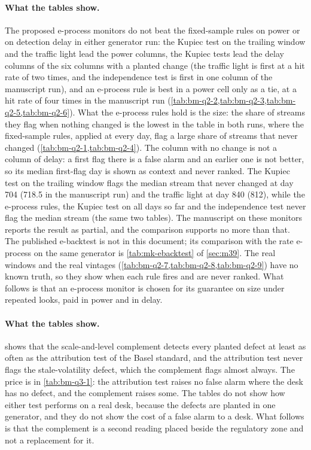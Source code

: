

\paragraph{What the tables show.} The proposed e-process monitors do not beat the fixed-sample rules on power or on detection delay in either generator run: the Kupiec test on the trailing window and the traffic light lead the power columns, the Kupiec tests lead the delay columns of the six columns with a planted change (the traffic light is first at a hit rate of two times, and the independence test is first in one column of the manuscript run), and an e-process rule is best in a power cell only as a tie, at a hit rate of four times in the manuscript run (\cref{tab:bm-q2-2,tab:bm-q2-3,tab:bm-q2-5,tab:bm-q2-6}). What the e-process rules hold is the size: the share of streams they flag when nothing changed is the lowest in the table in both runs, where the fixed-sample rules, applied at every day, flag a large share of streams that never changed (\cref{tab:bm-q2-1,tab:bm-q2-4}). The column with no change is not a column of delay: a first flag there is a false alarm and an earlier one is not better, so its median first-flag day is shown as context and never ranked. The Kupiec test on the trailing window flags the median stream that never changed at day 704 (718.5 in the manuscript run) and the traffic light at day 840 (812), while the e-process rules, the Kupiec test on all days so far and the independence test never flag the median stream (the same two tables). The manuscript on these monitors reports the result as partial, and the comparison supports no more than that. The published e-backtest is not in this document; its comparison with the rate e-process on the same generator is \cref{tab:mk-ebacktest} of \cref{sec:m39}. The real windows and the real vintages (\cref{tab:bm-q2-7,tab:bm-q2-8,tab:bm-q2-9}) have no known truth, so they show when each rule fires and are never ranked. What follows is that an e-process monitor is chosen for its guarantee on size under repeated looks, paid in power and in delay.



\paragraph{What the tables show.}  shows that the scale-and-level complement detects every planted defect at least as often as the attribution test of the Basel standard, and the attribution test never flags the stale-volatility defect, which the complement flags almost always. The price is in \cref{tab:bm-q3-1}: the attribution test raises no false alarm where the desk has no defect, and the complement raises some. The tables do not show how either test performs on a real desk, because the defects are planted in one generator, and they do not show the cost of a false alarm to a desk. What follows is that the complement is a second reading placed beside the regulatory zone and not a replacement for it.


